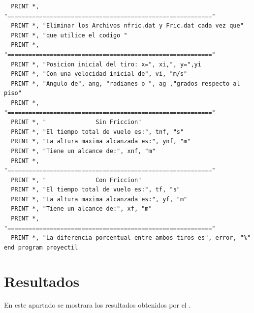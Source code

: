 \documentclass[12pt]{article}
\begin{document}
\begin{verbatim}
  PRINT *, "=========================================================="
  PRINT *, "Eliminar los Archivos nfric.dat y Fric.dat cada vez que"
  PRINT *, "que utilice el codigo "
  PRINT *, "=========================================================="
  PRINT *, "Posicion inicial del tiro: x=", xi,", y=",yi
  PRINT *, "Con una velocidad inicial de", vi, "m/s"
  PRINT *, "Angulo de", ang, "radianes o ", ag ,"grados respecto al piso"
  PRINT *, "=========================================================="
  PRINT *, "              Sin Friccion"
  PRINT *, "El tiempo total de vuelo es:", tnf, "s"
  PRINT *, "La altura maxima alcanzada es:", ynf, "m"
  PRINT *, "Tiene un alcance de:", xnf, "m"
  PRINT *, "=========================================================="
  PRINT *, "              Con Friccion"
  PRINT *, "El tiempo total de vuelo es:", tf, "s"
  PRINT *, "La altura maxima alcanzada es:", yf, "m"
  PRINT *, "Tiene un alcance de:", xf, "m"
  PRINT *, "=========================================================="
  PRINT *, "La diferencia porcentual entre ambos tiros es", error, "%"
end program proyectil

\end{verbatim}
\pagebreak
\section{Resultados}
En este apartado se mostrara los resultados obtenidos por el .
\end{document}
